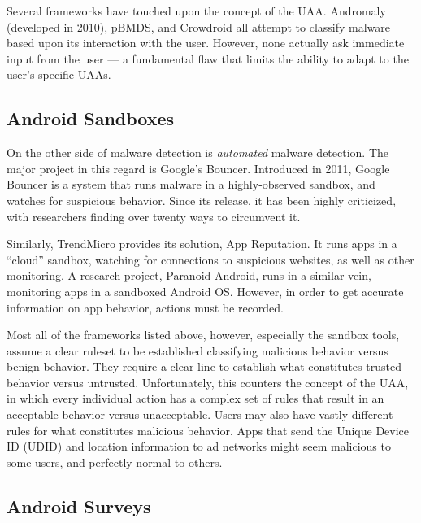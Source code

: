 \documentclass{acm_proc_article-sp}
\begin{document}
Several frameworks have touched upon the concept of the UAA. Andromaly\citep{shabtai2012andromaly} (developed in 2010), pBMDS\citep{xie2010pbmds}, and Crowdroid\citep{burguera2011crowdroid} all attempt to classify malware based upon its interaction with the user. However, none actually ask immediate input from the user --- a fundamental flaw that limits the ability to adapt to the user's specific UAAs.

\subsection{Android Sandboxes}
On the other side of malware detection is \textit{automated} malware detection. The major project in this regard is Google's Bouncer\citep{googlebouncer}. Introduced in 2011, Google Bouncer is a system that runs malware in a highly-observed sandbox, and watches for suspicious behavior. Since its release, it has been highly criticized\citep{mansfield2012android}, with researchers finding over twenty ways to circumvent it.

Similarly, TrendMicro provides its solution, App Reputation\citep{trendmicroappreputation}. It runs apps in a ``cloud'' sandbox, watching for connections to suspicious websites, as well as other monitoring. A research project, Paranoid Android\citep{portokalidis2010paranoid}, runs in a similar vein, monitoring apps in a sandboxed Android OS. However, in order to get accurate information on app behavior, actions must be recorded.

Most all of the frameworks listed above, however, especially the sandbox tools, assume a clear ruleset to be established classifying malicious behavior versus benign behavior. They require a clear line to establish what constitutes trusted behavior versus untrusted. Unfortunately, this counters the concept of the UAA, in which every individual action has a complex set of rules that result in an acceptable behavior versus unacceptable. Users may also have vastly different rules for what constitutes malicious behavior. Apps that send the Unique Device ID (UDID) and location information to ad networks might seem malicious to some users, and perfectly normal to others.


\subsection{Android Surveys}
\end{document}
